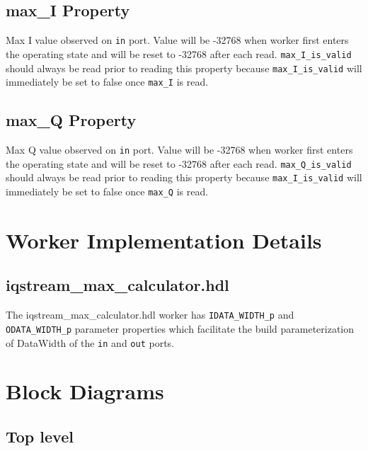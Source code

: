\documentclass{article}
\def\comp{temp}
\def\comp{iqstream\_max\_calculator}
\def\comp{iqstream\_max\_calculator}
\begin{document}
\subsection*{max\_I Property}
Max I value observed on \verb+in+ port. Value will be -32768
                       when worker first enters the operating state and will be
                       reset to -32768 after each read. \verb+max_I_is_valid+ should
                       always be read prior to reading this property because
                       \verb+max_I_is_valid+ will immediately be set to false once
                       \verb+max_I+ is read.
\subsection*{max\_Q Property}
Max Q value observed on \verb+in+ port. Value will be -32768
                       when worker first enters the operating state and will be
                       reset to -32768 after each read. \verb+max_Q_is_valid+ should
                       always be read prior to reading this property because
                       \verb+max_I_is_valid+ will immediately be set to false once
                       \verb+max_Q+ is read.

\section*{Worker Implementation Details}
\subsection*{\comp.hdl}
The \comp.hdl worker has \verb+IDATA_WIDTH_p+ and \verb+ODATA_WIDTH_p+ parameter properties which facilitate the build parameterization of DataWidth of the \verb+in+ and \verb+out+ ports.

\section*{Block Diagrams}
\subsection*{Top level}
\end{document}
